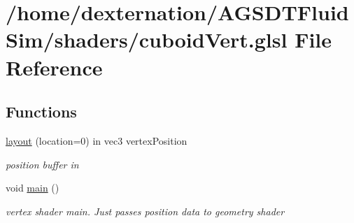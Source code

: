 \hypertarget{cuboid_vert_8glsl}{\section{/home/dexternation/\-A\-G\-S\-D\-T\-Fluid\-Sim/shaders/cuboid\-Vert.glsl File Reference}
\label{cuboid_vert_8glsl}
}
\subsection*{Functions}
\begin{DoxyCompactItemize}
\item 
\hypertarget{cuboid_vert_8glsl_a3a9bed495f596aa8aed4121aacc43fdd}{\hyperlink{cuboid_vert_8glsl_a3a9bed495f596aa8aed4121aacc43fdd}{layout} (location=0) in vec3 vertex\-Position}\label{cuboid_vert_8glsl_a3a9bed495f596aa8aed4121aacc43fdd}

\begin{DoxyCompactList}\small\item\em position buffer in \end{DoxyCompactList}\item 
\hypertarget{cuboid_vert_8glsl_acdef7a1fd863a6d3770c1268cb06add3}{void \hyperlink{cuboid_vert_8glsl_acdef7a1fd863a6d3770c1268cb06add3}{main} ()}\label{cuboid_vert_8glsl_acdef7a1fd863a6d3770c1268cb06add3}

\begin{DoxyCompactList}\small\item\em vertex shader main. Just passes position data to geometry shader \end{DoxyCompactList}\end{DoxyCompactItemize}
